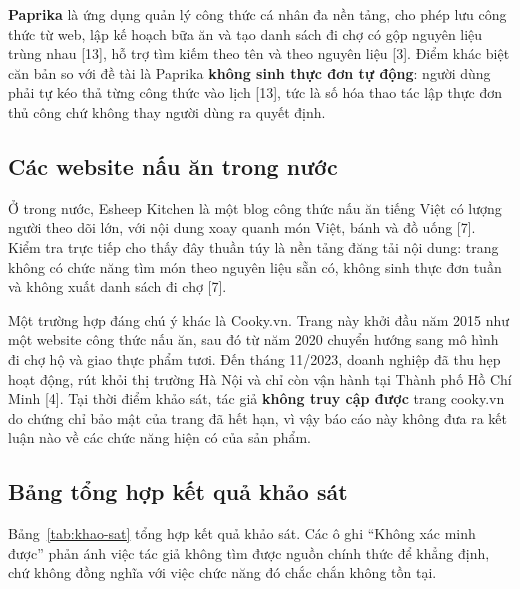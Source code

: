 \textbf{Paprika} là ứng dụng quản lý công thức cá nhân đa nền tảng, cho phép lưu
công thức từ web, lập kế hoạch bữa ăn và tạo danh sách đi chợ có gộp nguyên liệu
trùng nhau [13], hỗ trợ tìm kiếm theo tên và theo nguyên liệu [3]. Điểm khác
biệt căn bản so với đề tài là Paprika \textbf{không sinh thực đơn tự động}:
người dùng phải tự kéo thả từng công thức vào lịch [13], tức là số hóa thao tác
lập thực đơn thủ công chứ không thay người dùng ra quyết định.

\subsection{Các website nấu ăn trong nước}

Ở trong nước, Esheep Kitchen là một blog công thức nấu ăn tiếng Việt có lượng
người theo dõi lớn, với nội dung xoay quanh món Việt, bánh và đồ uống [7]. Kiểm
tra trực tiếp cho thấy đây thuần túy là nền tảng đăng tải nội dung: trang không
có chức năng tìm món theo nguyên liệu sẵn có, không sinh thực đơn tuần và không
xuất danh sách đi chợ [7].

Một trường hợp đáng chú ý khác là Cooky.vn. Trang này khởi đầu năm 2015 như một
website công thức nấu ăn, sau đó từ năm 2020 chuyển hướng sang mô hình đi chợ hộ
và giao thực phẩm tươi. Đến tháng 11/2023, doanh nghiệp đã thu hẹp hoạt động, rút
khỏi thị trường Hà Nội và chỉ còn vận hành tại Thành phố Hồ Chí Minh [4]. Tại
thời điểm khảo sát, tác giả \textbf{không truy cập được} trang cooky.vn do chứng
chỉ bảo mật của trang đã hết hạn, vì vậy báo cáo này không đưa ra kết luận nào
về các chức năng hiện có của sản phẩm.

\subsection{Bảng tổng hợp kết quả khảo sát}

Bảng~\ref{tab:khao-sat} tổng hợp kết quả khảo sát. Các ô ghi ``Không xác minh
được'' phản ánh việc tác giả không tìm được nguồn chính thức để khẳng định, chứ
không đồng nghĩa với việc chức năng đó chắc chắn không tồn tại.

